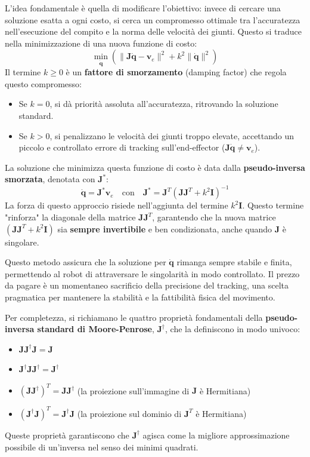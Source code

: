 \documentclass[11pt, a4paper]{report}
\begin{document}
L'idea fondamentale è quella di modificare l'obiettivo: invece di cercare una soluzione esatta a ogni costo, si cerca un compromesso ottimale tra l'accuratezza nell'esecuzione del compito e la norma delle velocità dei giunti. Questo si traduce nella minimizzazione di una nuova funzione di costo:
\[
    \min_{\dot{\bm{q}}} \left( \| \bm{J}\dot{\bm{q}} - \bm{v}_e \|^2 + k^2 \|\dot{\bm{q}}\|^2 \right)
\]
Il termine \(k \ge 0\) è un \textbf{fattore di smorzamento} (damping factor) che regola questo compromesso:
\begin{itemize}
    \item Se \(k=0\), si dà priorità assoluta all'accuratezza, ritrovando la soluzione standard.
    \item Se \(k>0\), si penalizzano le velocità dei giunti troppo elevate, accettando un piccolo e controllato errore di tracking sull'end-effector (\(\bm{J}\dot{\bm{q}} \neq \bm{v}_e\)).
\end{itemize}
La soluzione che minimizza questa funzione di costo è data dalla \textbf{pseudo-inversa smorzata}, denotata con \(\bm{J}^*\):
\[
    \dot{\bm{q}} = \bm{J}^* \bm{v}_e \quad \text{con} \quad \bm{J}^* = \bm{J}^T (\bm{J}\bm{J}^T + k^2\bm{I})^{-1}
\]
La forza di questo approccio risiede nell'aggiunta del termine \(k^2\bm{I}\). Questo termine "rinforza" la diagonale della matrice \(\bm{J}\bm{J}^T\), garantendo che la nuova matrice \((\bm{J}\bm{J}^T + k^2\bm{I})\) sia \textbf{sempre invertibile} e ben condizionata, anche quando \(\bm{J}\) è singolare.

Questo metodo assicura che la soluzione per \(\dot{\bm{q}}\) rimanga sempre stabile e finita, permettendo al robot di attraversare le singolarità in modo controllato. Il prezzo da pagare è un momentaneo sacrificio della precisione del tracking, una scelta pragmatica per mantenere la stabilità e la fattibilità fisica del movimento.

Per completezza, si richiamano le quattro proprietà fondamentali della \textbf{pseudo-inversa standard di Moore-Penrose}, \(\bm{J}^\dagger\), che la definiscono in modo univoco:
\begin{itemize}
    \item \(\bm{J}\bm{J}^\dagger\bm{J} = \bm{J}\)
    \item \(\bm{J}^\dagger\bm{J}\bm{J}^\dagger = \bm{J}^\dagger\)
    \item \((\bm{J}\bm{J}^\dagger)^T = \bm{J}\bm{J}^\dagger\) (la proiezione sull'immagine di \(\bm{J}\) è Hermitiana)
    \item \((\bm{J}^\dagger\bm{J})^T = \bm{J}^\dagger\bm{J}\) (la proiezione sul dominio di \(\bm{J}^T\) è Hermitiana)
\end{itemize}
Queste proprietà garantiscono che \(\bm{J}^\dagger\) agisca come la migliore approssimazione possibile di un'inversa nel senso dei minimi quadrati.
\end{document}
